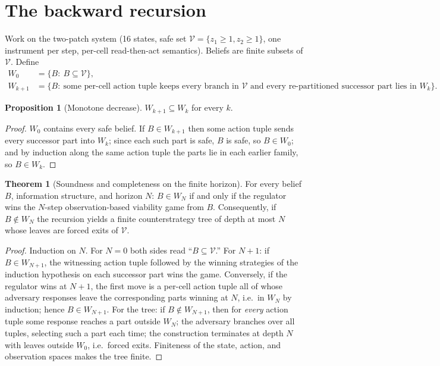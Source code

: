 \documentclass[10pt,twocolumn]{article}
\theoremstyle{definition}
\newtheorem{theorem}{Theorem}
\newtheorem{proposition}{Proposition}
\begin{document}
\section{The backward recursion}

Work on the two-patch system (16 states, safe set $\mathcal V=\{z_1\ge1,
z_2\ge1\}$, one instrument per step, per-cell read-then-act semantics).
Beliefs are finite subsets of $\mathcal V$. Define
\begin{align*}
W_0 &= \{B:\ B\subseteq\mathcal V\},\\
W_{k+1} &= \{B:\ \text{some per-cell action tuple keeps every branch
in }\mathcal V\text{ and every re-partitioned successor part lies in }
W_k\}.
\end{align*}

\begin{proposition}[Monotone decrease]
$W_{k+1}\subseteq W_k$ for every $k$.
\end{proposition}
\begin{proof}
$W_0$ contains every safe belief. If $B\in W_{k+1}$ then some action tuple
sends every successor part into $W_k$; since each such part is safe, $B$
is safe, so $B\in W_0$; and by induction along the same action tuple the
parts lie in each earlier family, so $B\in W_k$.
\end{proof}

\begin{theorem}[Soundness and completeness on the finite horizon]
\label{thm:complete}
For every belief $B$, information structure, and horizon $N$: $B\in W_N$
if and only if the regulator wins the $N$-step observation-based viability
game from $B$. Consequently, if $B\notin W_N$ the recursion yields a
finite counterstrategy tree of depth at most $N$ whose leaves are forced
exits of $\mathcal V$.
\end{theorem}
\begin{proof}
Induction on $N$. For $N=0$ both sides read ``$B\subseteq\mathcal V$.''
For $N+1$: if $B\in W_{N+1}$, the witnessing action tuple followed by the
winning strategies of the induction hypothesis on each successor part wins
the game. Conversely, if the regulator wins at $N+1$, the first move is a
per-cell action tuple all of whose adversary responses leave the
corresponding parts winning at $N$, i.e.\ in $W_N$ by induction; hence
$B\in W_{N+1}$. For the tree: if $B\notin W_{N+1}$, then for
\emph{every} action tuple some response reaches a part outside $W_N$; the
adversary branches over all tuples, selecting such a part each time; the
construction terminates at depth $N$ with leaves outside $W_0$, i.e.\
forced exits. Finiteness of the state, action, and observation spaces
makes the tree finite.
\end{proof}
\end{document}
